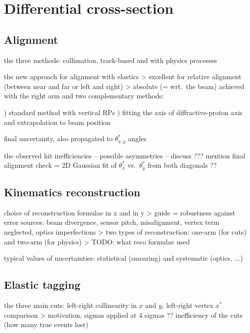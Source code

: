 \section{Differential cross-section}

\subsection{Alignment}

\> the three methods: collimation, track-based and with physics processes

\> the new approach for alignment with elastics
\>> excellent for relative alignment (between near and far or left and right)
\>> absolute (= wrt.~the beam) achieved with the right arm and two complementary methods:

) standard method with vertical RPs
) fitting the axis of diffractive-proton axis and extrapolation to beam position

\> final uncertainty, also propagated to $\theta^*_{x, y}$ angles

\> the observed hit inefficiencies -- possible asymmetries -- discuss ???
\> mention final alignment check = 2D Gaussian fit of $\theta_x^*$ vs.~$\theta_y^*$ from both diagonals ??


\subsection{Kinematics reconstruction}

\> choice of reconstruction formulae in x and in y
\>> guide = robustness against error sources: beam divergence, sensor pitch, misalignment, vertex term neglected, optics imperfections
\>> two types of reconstruction: one-arm (for cuts) and two-arm (for physics)
\>> TODO: what reco formulae used

\> typical values of uncertainties: statistical (smearing) and systematic (optics, ...)

\subsection{Elastic tagging}

\> the three main cuts: left-right collinearity in $x$ and $y$, left-right vertex $x^*$ comparison
\>> motivation, sigmas
\> applied at 4 sigmas ??
\> inefficiency of the cuts (how many true events lost)

